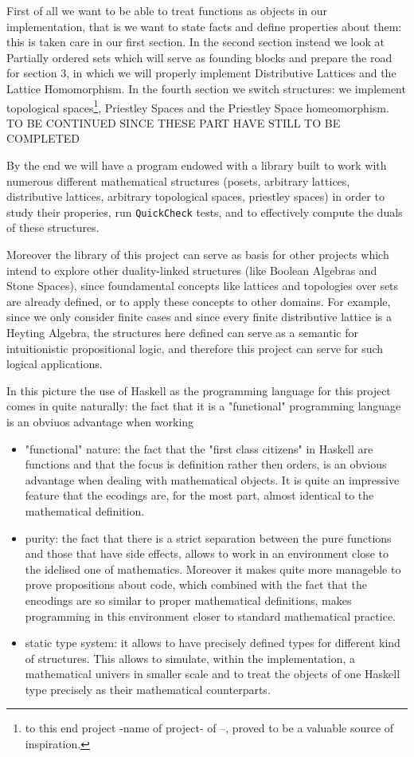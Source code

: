 \documentclass[12pt,a4paper]{article}
\begin{document}
First of all we want to be able to treat functions as objects in our implementation, that is we want to state facts and define properties about them: this is taken care in our first section. In the second section instead we look at Partially ordered sets which will serve as founding blocks and prepare the road for section 3, in which we will properly implement Distributive Lattices and the Lattice Homomorphism. In the fourth section we switch structures: we implement topological spaces\footnote{to this end project -name of project- of --, proved to be a valuable source of inspiration.}, Priestley Spaces and the Priestley Space homeomorphism. TO BE CONTINUED SINCE THESE PART HAVE STILL TO BE COMPLETED

By the end we will have a program endowed with a library built to work with numerous different mathematical structures (posets, arbitrary lattices, distributive lattices, arbitrary topological spaces, priestley spaces) in order to study their properies, run \texttt{QuickCheck} tests, and to effectively compute the duals of these structures.

Moreover the library of this project can serve as basis for other projects which intend to explore other duality-linked structures (like Boolean Algebras and Stone Spaces), since foundamental concepts like lattices and topologies over sets are already defined, or to apply these concepts to other domains. For example, since we only consider finite cases and since every finite distributive lattice is a Heyting Algebra, the structures here defined can serve as a semantic for intuitionistic propositional logic, and therefore this project can serve for such logical applications.


In this picture the use of Haskell as the programming language for this project comes in quite naturally: the fact that it is a "functional" programming language is an obviuos advantage when working 

\begin{itemize}
    \item "functional" nature: the fact that the "first class citizens" in Haskell are functions and that the focus is definition rather then orders, is an obvious advantage when dealing with mathematical objects. It is quite an impressive feature that the ecodings are, for the most part, almost identical to the mathematical definition. 
    \item purity: the fact that there is a strict separation between the pure functions and those that have side effects, allows to work in an environment close to the idelised one of mathematics. Moreover it makes quite more manageble to prove propositions about code, which combined with the fact that the encodings are so similar to proper mathematical definitions, makes programming in this environment closer to standard mathematical practice.
    \item static type system: it allows to have precisely defined types for different kind of structures. This allows to simulate, within the implementation, a mathematical univers in smaller scale and to treat the objects of one Haskell type precisely as their mathematical counterparts.  
\end{itemize}
\end{document}
